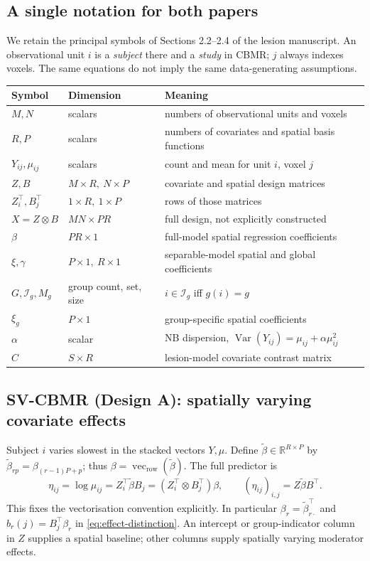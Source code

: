 \documentclass[11pt,a4paper]{article}
\newcommand{\R}{\mathbb{R}}
\newcommand{\Var}{\operatorname{Var}}
\newcommand{\vecrow}{\operatorname{vec}_{\mathrm{row}}}
\numberwithin{equation}{section}
\begin{document}
\subsection{A single notation for both papers}
We retain the principal symbols of Sections 2.2--2.4 of the lesion manuscript.
An observational unit $i$ is a \emph{subject} there and a \emph{study} in CBMR;
$j$ always indexes voxels. The same equations do not imply the same
data-generating assumptions.
\begin{center}
\begin{tabular}{lll}
\toprule
Symbol & Dimension & Meaning\\
\midrule
$M,N$ & scalars & numbers of observational units and voxels\\
$R,P$ & scalars & numbers of covariates and spatial basis functions\\
$Y_{ij},\mu_{ij}$ & scalars & count and mean for unit $i$, voxel $j$\\
$Z,B$ & $M\times R,\ N\times P$ & covariate and spatial design matrices\\
$Z_i^\top,B_j^\top$ & $1\times R,\ 1\times P$ & rows of those matrices\\
$X=Z\otimes B$ & $MN\times PR$ & full design, not explicitly constructed\\
$\beta$ & $PR\times1$ & full-model spatial regression coefficients\\
$\xi,\gamma$ & $P\times1,\ R\times1$ & separable-model spatial and global coefficients\\
$G,\mathcal I_g,M_g$ & group count, set, size & $i\in\mathcal I_g$ iff $g(i)=g$\\
$\xi_g$ & $P\times1$ & group-specific spatial coefficients\\
$\alpha$ & scalar & NB dispersion, $\Var(Y_{ij})=\mu_{ij}+\alpha\mu_{ij}^2$\\
$C$ & $S\times R$ & lesion-model covariate contrast matrix\\
\bottomrule
\end{tabular}
\end{center}
\subsection{SV-CBMR (Design A): spatially varying covariate effects}
Subject $i$ varies slowest in the stacked vectors $Y,\mu$. Define
$\widetilde\beta\in\R^{R\times P}$ by
$\widetilde\beta_{rp}=\beta_{(r-1)P+p}$; thus
$\beta=\vecrow(\widetilde\beta)$. The full predictor is
\begin{equation}\label{eq:full}
 \eta_{ij}=\log\mu_{ij}
 =Z_i^\top\widetilde\beta B_j
 =(Z_i^\top\otimes B_j^\top)\beta,\qquad
 (\eta_{ij})_{i,j}=Z\widetilde\beta B^\top.
\end{equation}
This fixes the vectorisation convention explicitly.
In particular $\beta_r=\widetilde\beta_{r\cdot}^{\top}$ and
$b_r(j)=B_j^\top\beta_r$ in \eqref{eq:effect-distinction}.
An intercept or group-indicator column in $Z$ supplies a spatial
baseline; other columns supply spatially varying moderator effects.
\end{document}
